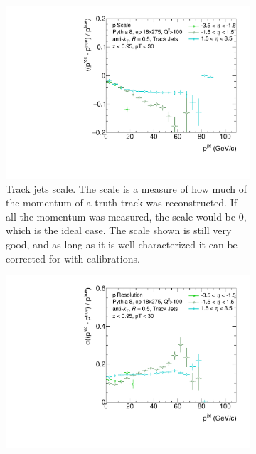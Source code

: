 \begin{figure}
    \centering
    \begin{subfigure}{0.4\textwidth}
        \centering
        \includegraphics[width=\linewidth]{figs/Final_Plots/pScale_track_grouped.pdf}
        \caption{Track jets scale.  The scale is a measure of how much of the momentum of a truth track was reconstructed.  If all the momentum was measured, the scale would be 0, which is the ideal case.  The scale shown is still very good, and as long as it is well characterized it can be corrected for with calibrations.  }
        \label{fig:track_momentum_scale}
    \end{subfigure}
    \hfill
    \begin{subfigure}{0.4\textwidth}
        \centering
        \includegraphics[width=\linewidth]{figs/Final_Plots/pReso_track_grouped.pdf}

\end{subfigure}
\end{figure}
